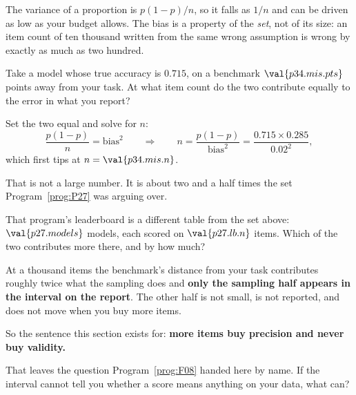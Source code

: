 \begin{fr}

The variance of a proportion is $p(1-p)/n$, so it falls as $1/n$ and can be
driven as low as your budget allows. The bias is a property of the
\emph{set}, not of its size: an item count of ten thousand written from the
same wrong assumption is wrong by exactly as much as two hundred.

Take a model whose true accuracy is $\num{0.715}$, on a benchmark
$\val{p34.mis.pts}$ points away from your task. At what item count do the two
contribute equally to the error in what you report?
\dotline
\nextframe
\end{fr}

\begin{fr}
\begin{ansblock}
Set the two equal and solve for $n$:
\[ \frac{p(1-p)}{n} = \text{bias}^{2}
   \qquad\Longrightarrow\qquad
   n = \frac{p(1-p)}{\text{bias}^{2}}
     = \frac{\num{0.715} \times \num{0.285}}{\num{0.02}^{2}} , \]
which first tips at $n = \val{p34.mis.n}$.
\end{ansblock}

That is not a large number. It is about two and a half times the set
Program~\ref{prog:P27} was arguing over.

That program's leaderboard is a different table from the set above:
$\val{p27.models}$ models, each scored on $\val{p27.lb.n}$ items. Which of
the two contributes more there, and by how much?
\dotline
\nextframe
\end{fr}

\begin{fr}

At a thousand items the benchmark's distance from your task contributes
roughly twice what the sampling does \dash{} and \textbf{only the sampling
half appears in the interval on the report}. The other half is not small, is
not reported, and does not move when you buy more items.

So the sentence this section exists for: \textbf{more items buy precision and
never buy validity.}

That leaves the question Program~\ref{prog:F08} handed here by name. If the
interval cannot tell you whether a score means anything on your data, what
can?
\dotline
\nextframe
\end{fr}

